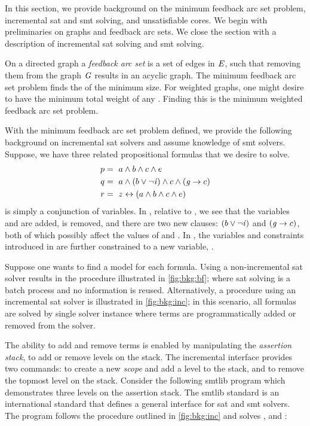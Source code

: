 \label{section:background}
%

%

In this section, we provide background on the minimum feedback arc set problem,
incremental \ac{sat} and \ac{smt} solving, and unsatisfiable cores. We begin
with preliminaries on graphs and feedback arc sets. We close the section with a
description of incremental \ac{sat} solving and \ac{smt} solving.

On a directed graph  a \emph{feedback arc set}  is a set
of edges in $\mathit{E}$, such that removing them from the graph $\mathit{G}$ results in
an acyclic graph. The minimum feedback arc set problem finds the
 of the minimum size. For weighted graphs, one might desire
 to have the minimum total weight of any . Finding this
 is the minimum weighted feedback arc set problem.

%
%
With the minimum feedback arc set problem defined, we provide the following
background on incremental \ac{sat} solvers and assume knowledge of \ac{smt}
solvers. Suppose, we have three related propositional formulas that we desire to
solve.
%
\begin{align*}
  p &=\ a \wedge b \wedge c \wedge e  \\
  q &=\ a \wedge (b \vee \neg \mathit{i}{}) \wedge c \wedge (\mathit{g}{} \rightarrow c) \\
  r &=~z \leftrightarrow (a \wedge b \wedge c \wedge e)
\end{align*}
%
\pV{} is simply a conjunction of variables. In \qV{}, relative to \pV{}, we see
that the variables \iV{} and \gV{} are added, \eV{} is removed, and there are
two new clauses: $(b \vee \neg \mathit{i}{})$ and $(\mathit{g}{} \rightarrow c)$, both of
which possibly affect the values of \bV{} and \cV{}. In \rV{}, the variables and
constraints introduced in \pV{} are further constrained to a new variable,
\zV{}.

Suppose one wants to find a model for each formula. Using a non-incremental
\ac{sat} solver results in the procedure illustrated in \autoref{fig:bkg:bf};
where \ac{sat} solving is a batch process and no information is reused.
Alternatively, a procedure using an incremental \ac{sat} solver is illustrated
in \autoref{fig:bkg:inc}; in this scenario, all formulas are solved by single
solver instance where terms are programmatically added or removed from the
solver.

The ability to add and remove terms is enabled by manipulating the
\textit{assertion stack}, to add or remove levels on the stack. The incremental
interface provides two commands:  to create a new \emph{scope} and add
a level to the stack, and  to remove the topmost level on the stack.
Consider the following \acl{smtlib} program which demonstrates three levels on
the assertion stack. The \acl{smtlib} standard is an international standard that
defines a general interface for \ac{sat} and \ac{smt} solvers. The program
follows the procedure outlined in \autoref{fig:bkg:inc} and solves \pV, \qV{}
and \rV{}:

